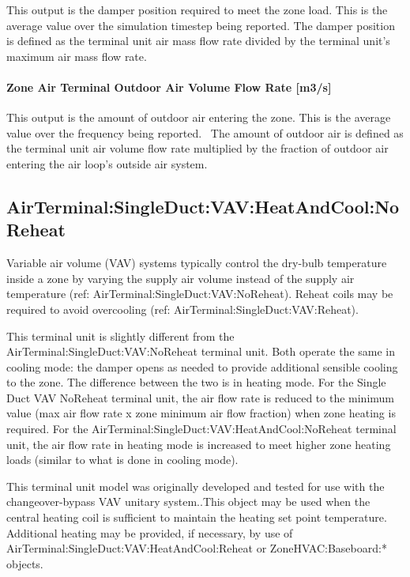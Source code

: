This output is the damper position required to meet the zone load. This is the average value over the simulation timestep being reported. The damper position is defined as the terminal unit air mass flow rate divided by the terminal unit's maximum air mass flow rate.

\paragraph{Zone Air Terminal Outdoor Air Volume Flow Rate {[}m3/s{]}}\label{zone-air-terminal-outdoor-air-volume-flow-rate-m3s-1}

This output is the amount of outdoor air entering the zone. This is the average value over the frequency being reported.~ The amount of outdoor air is defined as the terminal unit air volume flow rate multiplied by the fraction of outdoor air entering the air loop's outside air system.

\subsection{AirTerminal:SingleDuct:VAV:HeatAndCool:NoReheat}\label{airterminalsingleductvavheatandcoolnoreheat}

Variable air volume (VAV) systems typically control the dry-bulb temperature inside a zone by varying the supply air volume instead of the supply air temperature (ref: AirTerminal:SingleDuct:VAV:NoReheat). Reheat coils may be required to avoid overcooling (ref: AirTerminal:SingleDuct:VAV:Reheat).

This terminal unit is slightly different from the AirTerminal:SingleDuct:VAV:NoReheat terminal unit. Both operate the same in cooling mode: the damper opens as needed to provide additional sensible cooling to the zone. The difference between the two is in heating mode. For the Single Duct VAV NoReheat terminal unit, the air flow rate is reduced to the minimum value (max air flow rate x zone minimum air flow fraction) when zone heating is required. For the AirTerminal:SingleDuct:VAV:HeatAndCool:NoReheat terminal unit, the air flow rate in heating mode is increased to meet higher zone heating loads (similar to what is done in cooling mode).

This terminal unit model was originally developed and tested for use with the changeover-bypass VAV unitary system..This object may be used when the central heating coil is sufficient to maintain the heating set point temperature. Additional heating may be provided, if necessary, by use of AirTerminal:SingleDuct:VAV:HeatAndCool:Reheat or ZoneHVAC:Baseboard:* objects.

